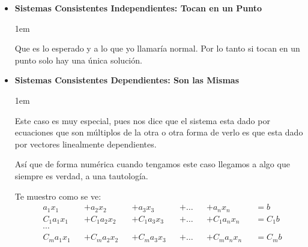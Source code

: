 \documentclass[12pt]{report}                                    %
\newenvironment{SmallIndentation}[1][0.75em]                    %
    {\begin{adjustwidth}{#1}{}\begin{footnotesize}}                 %
    {\end{footnotesize}\end{adjustwidth}}                           %
\begin{document}
                \begin{itemize}

                    \item
                        \textbf{Sistemas Consistentes Independientes: Tocan en un Punto}

                        \begin{SmallIndentation}[1em]
                            Que es lo esperado y a lo que yo llamaría normal.
                            Por lo tanto si tocan en un punto solo hay una única solución.
                        \end{SmallIndentation}


                    \item
                        \textbf{Sistemas Consistentes Dependientes: Son las Mismas}

                        \begin{SmallIndentation}[1em]

                            Este caso es muy especial, pues nos dice que el sistema esta
                            dado por ecuaciones que son múltiplos de la otra o otra forma
                            de verlo es que esta dado por vectores linealmente dependientes.

                            Así que de forma numérica cuando tengamos este caso llegamos a
                            algo que siempre es verdad, a una tautología.

                            Te muestro como se ve:
                            \begin{equation*}
                            \begin{split}
                                &a_1x_1    &&+ a_2x_2    &&+ a_3x_3    &&+ \dots &&+ a_nx_n    &&= b    \\
                                &C_1a_1x_1 &&+ C_1a_2x_2 &&+ C_1a_3x_3 &&+ \dots &&+ C_1a_nx_n &&= C_1b \\
                                &\cdots                                                                 \\
                                &C_ma_1x_1 &&+ C_ma_2x_2 &&+ C_ma_3x_3 &&+ \dots &&+ C_ma_nx_n &&= C_mb \\
                            \end{split}
                            \end{equation*}


\end{SmallIndentation}
\end{itemize}
\end{document}
